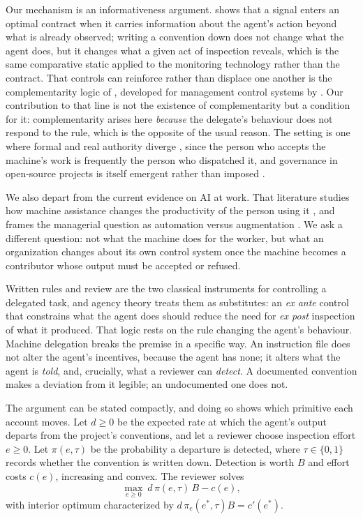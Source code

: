 \documentclass[mnsc]{informs4}
\begin{document}
Our mechanism is an informativeness argument. \citet{holmstrom1979moral} shows
that a signal enters an optimal contract when it carries information about the
agent's action beyond what is already observed; writing a convention down does not
change what the agent does, but it changes what a given act of inspection reveals,
which is the same comparative static applied to the monitoring technology rather
than the contract. That controls can reinforce rather than displace one another is
the complementarity logic of \citet{milgrom1990economics, milgrom1995complementarities},
developed for management control systems by \citet{grabner2013management}. Our
contribution to that line is not the existence of complementarity but a condition
for it: complementarity arises here \emph{because} the delegate's behaviour does
not respond to the rule, which is the opposite of the usual reason. The setting is
one where formal and real authority diverge \citep{aghion1997authority}, since the
person who accepts the machine's work is frequently the person who dispatched it,
and governance in open-source projects is itself emergent rather than imposed
\citep{omahony2007emergence}.

We also depart from the current evidence on AI at work. That literature studies how
machine assistance changes the productivity of the person using it
\citep{peng2023impact, dellacqua2023navigating, cui2025effects}, and frames the
managerial question as automation versus augmentation
\citep{raisch2021artificial}. We ask a different question: not what the machine
does for the worker, but what an organization changes about its own control system
once the machine becomes a contributor whose output must be accepted or refused.

Written rules and review are the two classical instruments for controlling a
delegated task, and agency theory treats them as substitutes: an \emph{ex ante}
control that constrains what the agent does should reduce the need for \emph{ex
post} inspection of what it produced. That logic rests on the rule changing the
agent's behaviour. Machine delegation breaks the premise in a specific way. An
instruction file does not alter the agent's incentives, because the agent has none;
it alters what the agent is \emph{told}, and, crucially, what a reviewer can
\emph{detect}. A documented convention makes a deviation from it legible; an
undocumented one does not.

The argument can be stated compactly, and doing so shows which primitive each
account moves. Let $d \geq 0$ be the expected rate at which the agent's output
departs from the project's conventions, and let a reviewer choose inspection effort
$e \geq 0$. Let $\pi(e,\tau)$ be the probability a departure is detected, where
$\tau \in \{0,1\}$ records whether the convention is written down. Detection is
worth $B$ and effort costs $c(e)$, increasing and convex. The reviewer solves
\begin{equation}
\max_{e \geq 0}\ d\,\pi(e,\tau)\,B - c(e),
\label{eq:reviewer}
\end{equation}
with interior optimum characterized by $d\,\pi_e(e^{*},\tau)B = c'(e^{*})$.
\end{document}
